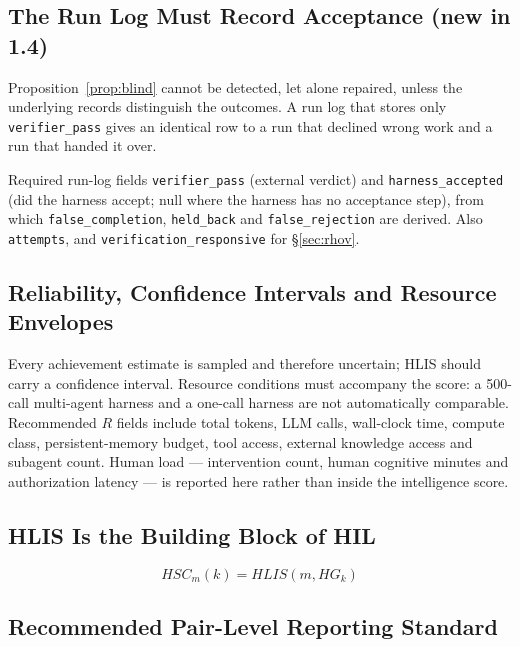 \documentclass[11pt]{article}
\theoremstyle{definition}
\begin{document}
\subsection{The Run Log Must Record Acceptance (new in 1.4)}\label{sec:runlog}

Proposition~\ref{prop:blind} cannot be detected, let alone repaired, unless the underlying records distinguish the outcomes. A run log that stores only \texttt{verifier\_pass} gives an identical row to a run that declined wrong work and a run that handed it over.

\begin{claimbox}{Required run-log fields}
\texttt{verifier\_pass} (external verdict) and \texttt{harness\_accepted} (did the harness accept; null where the harness has no acceptance step), from which \texttt{false\_completion}, \texttt{held\_back} and \texttt{false\_rejection} are derived. Also \texttt{attempts}, and \texttt{verification\_responsive} for \S\ref{sec:rhov}.
\end{claimbox}

\subsection{Reliability, Confidence Intervals and Resource Envelopes}\label{sec:resources}

Every achievement estimate is sampled and therefore uncertain; HLIS should carry a confidence interval. Resource conditions must accompany the score: a 500-call multi-agent harness and a one-call harness are not automatically comparable. Recommended $R$ fields include total tokens, LLM calls, wall-clock time, compute class, persistent-memory budget, tool access, external knowledge access and subagent count. Human load --- intervention count, human cognitive minutes and authorization latency --- is reported here rather than inside the intelligence score.

\subsection{HLIS Is the Building Block of HIL}

\begin{equation}
HSC_m(k) = HLIS(m, HG_k)
\end{equation}

\subsection{Recommended Pair-Level Reporting Standard}\label{sec:report}
\end{document}
